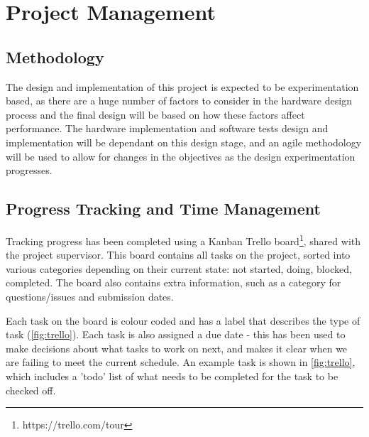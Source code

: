 \chapter{Project Management}
\label{ch:project_management}

\section{Methodology}
The design and implementation of this project is expected to be experimentation based, as there are a huge number of factors to consider in the hardware design process and the final design will be based on how these factors affect performance. The hardware implementation and software tests design and implementation will be dependant on this design stage, and an agile methodology will be used to allow for changes in the objectives as the design experimentation progresses.

\section{Progress Tracking and Time Management}
Tracking progress has been completed using a Kanban Trello board\footnote{https://trello.com/tour}, shared with the project supervisor. This board contains all tasks on the project, sorted into various categories depending on their current state: not started, doing, blocked, completed. The board also contains extra information, such as a category for questions/issues and submission dates.

Each task on the board is colour coded and has a label that describes the type of task (\ref{fig:trello}). Each task is also assigned a due date - this has been used to make decisions about what tasks to work on next, and makes it clear when we are failing to meet the current schedule. An example task is shown in \ref{fig:trello}, which includes a 'todo' list of what needs to be completed for the task to be checked off.

